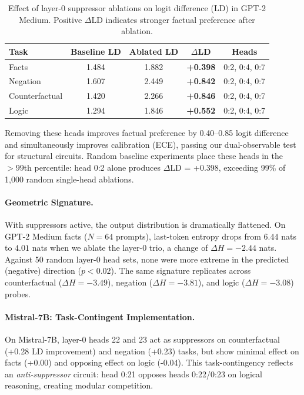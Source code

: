 \begin{table}[h]
    \centering
    \caption{Effect of layer-0 suppressor ablations on logit difference (LD) in GPT-2 Medium. Positive $\Delta$LD indicates stronger factual preference after ablation.}
    \label{tab:exp1a-impact}
    \begin{tabular}{lcccc}
        \toprule
        Task & Baseline LD & Ablated LD & $\Delta$LD & Heads \\
        \midrule
        Facts          & 1.484 & 1.882 & \textbf{+0.398} & 0:2, 0:4, 0:7 \\
        Negation       & 1.607 & 2.449 & \textbf{+0.842} & 0:2, 0:4, 0:7 \\
        Counterfactual & 1.420 & 2.266 & \textbf{+0.846} & 0:2, 0:4, 0:7 \\
        Logic          & 1.294 & 1.846 & \textbf{+0.552} & 0:2, 0:4, 0:7 \\
        \bottomrule
    \end{tabular}
\end{table}

Removing these heads improves factual preference by 0.40--0.85 logit difference and simultaneously improves calibration (ECE), passing our dual-observable test for structural circuits. Random baseline experiments place these heads in the $>99$th percentile: head 0:2 alone produces $\Delta$LD = +0.398, exceeding 99\% of 1,000 random single-head ablations.

\paragraph{Geometric Signature.}
With suppressors active, the output distribution is dramatically flattened. On GPT-2 Medium facts ($N=64$ prompts), last-token entropy drops from $6.44$ nats to $4.01$ nats when we ablate the layer-0 trio, a change of $\Delta H = -2.44$ nats. Against 50 random layer-0 head sets, none were more extreme in the predicted (negative) direction ($p < 0.02$). The same signature replicates across counterfactual ($\Delta H = -3.49$), negation ($\Delta H = -3.81$), and logic ($\Delta H = -3.08$) probes.

\paragraph{Mistral-7B: Task-Contingent Implementation.}
On Mistral-7B, layer-0 heads 22 and 23 act as suppressors on counterfactual (+0.28 LD improvement) and negation (+0.23) tasks, but show minimal effect on facts (+0.00) and opposing effect on logic (-0.04). This task-contingency reflects an \emph{anti-suppressor} circuit: head 0:21 opposes heads 0:22/0:23 on logical reasoning, creating modular competition.

